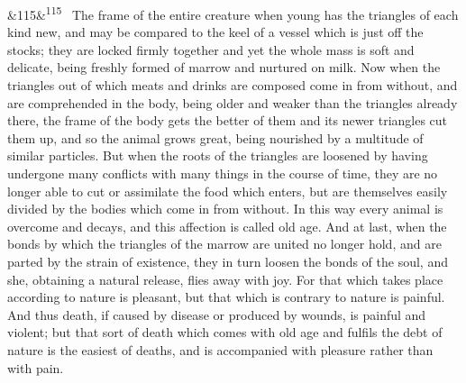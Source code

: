 \documentclass[12pt]{article}
\newcommand{\para}[1][]{\par\noindent\ifx&#1&\else\textsuperscript{\footnotesize #1}~\fi}
\begin{document}
\para[115] The frame of the entire creature when young has the triangles of each kind new, and may be compared to the keel of a vessel which is just off the stocks; they are locked firmly together and yet the whole mass is soft and delicate, being freshly formed of marrow and nurtured on milk. Now when the triangles out of which meats and drinks are composed come in from without, and are comprehended in the body, being older and weaker than the triangles already there, the frame of the body gets the better of them and its newer triangles cut them up, and so the animal grows great, being nourished by a multitude of similar particles. But when the roots of the triangles are loosened by having undergone many conflicts with many things in the course of time, they are no longer able to cut or assimilate the food which enters, but are themselves easily divided by the bodies which come in from without. In this way every animal is overcome and decays, and this affection is called old age. And at last, when the bonds by which the triangles of the marrow are united no longer hold, and are parted by the strain of existence, they in turn loosen the bonds of the soul, and she, obtaining a natural release, flies away with joy. For that which takes place according to nature is pleasant, but that which is contrary to nature is painful. And thus death, if caused by disease or produced by wounds, is painful and violent; but that sort of death which comes with old age and fulfils the debt of nature is the easiest of deaths, and is accompanied with pleasure rather than with pain.
\end{document}
